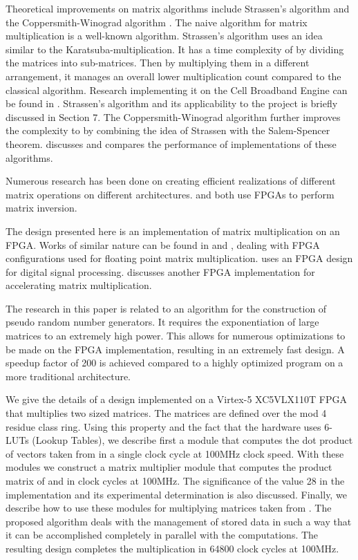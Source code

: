 \documentclass[11pt,twoside]{article}
\begin{document}
Theoretical improvements on matrix algorithms include Strassen's algorithm \cite{c12} and the Coppersmith-Winograd algorithm \cite{c2}. The naive algorithm for matrix multiplication is a well-known  algorithm. Strassen's algorithm uses an idea similar to the Karatsuba-multiplication. It has a time complexity of  by dividing the matrices into sub-matrices. Then by multiplying them in a different arrangement, it manages an overall lower multiplication count compared to the classical algorithm. Research implementing it on the Cell Broadband Engine can be found in \cite{c5}. Strassen's algorithm and its applicability to the project is briefly discussed in Section 7. The Coppersmith-Winograd algorithm further improves the complexity to  by combining the idea of Strassen with the Salem-Spencer theorem. \cite{c9} discusses and compares the performance of implementations of these algorithms.

Numerous research has been done on creating efficient realizations of different matrix operations on different architectures. \cite{c8} and \cite{c10} both use FPGAs to perform matrix inversion.

The design presented here is an implementation of matrix multiplication on an FPGA. Works of similar nature can be found in \cite{c1} and \cite{c4}, dealing with FPGA configurations used for floating point matrix multiplication. \cite{c11} uses an FPGA design for digital signal processing. \cite{c3} discusses another FPGA implementation for accelerating matrix multiplication.

The research in this paper is related to an algorithm for the construction of pseudo random number generators. It requires the exponentiation of large matrices to an extremely high power. This allows for numerous optimizations to be made on the FPGA implementation, resulting in an extremely fast design. A speedup factor of  200 is achieved compared to a highly optimized program on a more traditional architecture.

We give the details of a design implemented on a Virtex-5 XC5VLX110T FPGA that multiplies two  sized matrices. The matrices are defined over the mod 4 residue class ring. Using this property and the fact that the hardware uses 6-LUTs (Lookup Tables), we describe first a module that computes the dot product of vectors taken from  in a single clock cycle at 100MHz clock speed. With these modules we construct a matrix multiplier module that computes the  product matrix of  and  in  clock cycles at 100MHz. The significance of the value 28 in the implementation and its experimental determination is also discussed. Finally, we describe how to use these modules for multiplying matrices taken from . The proposed algorithm deals with the management of stored data in such a way that it can be accomplished completely in parallel with the computations. The resulting design completes the multiplication in 64800 clock cycles at 100MHz.
\end{document}

